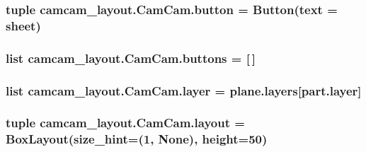 \subsubsection[{button}]{\setlength{\rightskip}{0pt plus 5cm}tuple camcam\+\_\+layout.\+Cam\+Cam.\+button = Button(text = sheet)\hspace{0.3cm}{\ttfamily [static]}}\label{classcamcam__layout_1_1_cam_cam_a94449317084eb1abc4707e2bc3c2ae95}
\hypertarget{classcamcam__layout_1_1_cam_cam_a61b884fcd41fdf82ee5558d7e422fc6b}{}
\subsubsection[{buttons}]{\setlength{\rightskip}{0pt plus 5cm}list camcam\+\_\+layout.\+Cam\+Cam.\+buttons = \mbox{[}$\,$\mbox{]}\hspace{0.3cm}{\ttfamily [static]}}\label{classcamcam__layout_1_1_cam_cam_a61b884fcd41fdf82ee5558d7e422fc6b}
\hypertarget{classcamcam__layout_1_1_cam_cam_a5e3add24ff41a90068b83cc1c73176e0}{}
\subsubsection[{layer}]{\setlength{\rightskip}{0pt plus 5cm}list camcam\+\_\+layout.\+Cam\+Cam.\+layer = plane.\+layers\mbox{[}part.\+layer\mbox{]}\hspace{0.3cm}{\ttfamily [static]}}\label{classcamcam__layout_1_1_cam_cam_a5e3add24ff41a90068b83cc1c73176e0}
\hypertarget{classcamcam__layout_1_1_cam_cam_ad68196dc02bf35acc187e607b1079882}{}
\subsubsection[{layout}]{\setlength{\rightskip}{0pt plus 5cm}tuple camcam\+\_\+layout.\+Cam\+Cam.\+layout = Box\+Layout(size\+\_\+hint=(1, None), height=50)\hspace{0.3cm}{\ttfamily [static]}}\label{classcamcam__layout_1_1_cam_cam_ad68196dc02bf35acc187e607b1079882}
\hypertarget{classcamcam__layout_1_1_cam_cam_ad0bee697a9661370ca2d19b1c0ed6b79}{}
